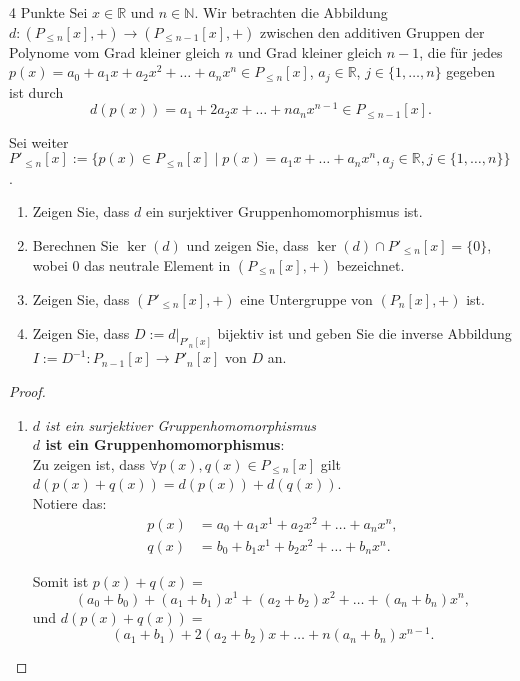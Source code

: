\documentclass{problemset}
\begin{document}
\begin{problem}{4 Punkte}
Sei $x \in \mathbb{R}$ und $n \in \mathbb{N}$.
Wir betrachten die Abbildung $d: (P_{\le n }[x], +) \to (P_{\le n-1}[x], +)$ zwischen den additiven Gruppen der Polynome vom Grad kleiner gleich $n$ und Grad kleiner gleich $n - 1$, die für jedes $p(x) = a_0 + a_1x + a_2x^2 + \ldots + a_nx^n \in P_{\le n}[x]$, $a_j \in \mathbb{R}$, $j \in \{1, \ldots, n\}$ gegeben ist durch \[
	d(p(x)) = a_1 + 2a_2x + \ldots + na_nx^{n-1} \in P_{\le n-1}[x].
\]

Sei weiter $P'_{\le n}[x] := \{p(x) \in P_{\le n}[x] \mid p(x) = a_1x + \ldots + a_nx^n, a_j \in \mathbb{R}, j \in \{1, \ldots, n\}\}$.

\begin{enumerate}
	\item Zeigen Sie, dass $d$ ein surjektiver Gruppenhomomorphismus ist.
	\item Berechnen Sie $\ker(d)$ und zeigen Sie, dass $\ker(d) \cap P'_{\le n}[x] = \{0\}$, wobei $0$ das neutrale Element in $(P_{\le n}[x], +)$ bezeichnet.
	\item Zeigen Sie, dass $(P'_{\le n}[x], +)$ eine Untergruppe von $(P_n[x], +)$ ist.
	\item Zeigen Sie, dass $D := d|_{P'_n[x]}$ bijektiv ist und geben Sie die inverse Abbildung $I := D^{-1}: P_{n-1}[x] \to P'_n[x]$ von $D$ an.
\end{enumerate}

\begin{proof}
	\begin{enumerate}
		\item \textit{$d$ ist ein surjektiver Gruppenhomomorphismus} \\
		      \textbf{$d$ ist ein Gruppenhomomorphismus}: \\
		      Zu zeigen ist, dass $\forall p(x),q(x) \in P_{\le n}[x]$ gilt $d(p(x) + q(x)) = d(p(x)) + d(q(x))$. \\

		      Notiere das:
		      \begin{align}
			      p(x) & = a_0 + a_1x^1 + a_2x^2 + \ldots + a_nx^n, \\
			      q(x) & = b_0 + b_1x^1 + b_2x^2 + \ldots + b_nx^n.
		      \end{align}

		      Somit ist $p(x) + q(x) =$ \[
			      (a_0+b_0) + (a_1+b_1)x^1 + (a_2 + b_2)x^2 + \ldots + (a_n+b_n)x^n,
		      \] und $d(p(x) + q(x)) =$ \[
			      (a_1+b_1) + 2(a_2 + b_2)x + \ldots + n(a_n+b_n)x^{n-1}.
		      \]


\end{enumerate}
\end{proof}
\end{problem}
\end{document}
